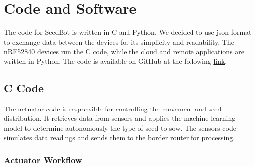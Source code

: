 \chapter{Code and Software}

The code for SeedBot is written in C and Python. We decided to use json format to exchange data between the devices for its simplicity and readability. The nRF52840 devices run the C code, while the cloud and remote applications are written in Python. The code is available on GitHub at the following \href {https://github.com/franocella/SeedBot_IoT}{link}. 
\section{C Code}
The actuator code is responsible for controlling the movement and seed distribution. It retrieves data from sensors and applies the machine learning model to determine autonomously the type of seed to sow.
The sensors code simulates data readings and sends them to the border router for processing.\\

\subsection{Actuator Workflow}

